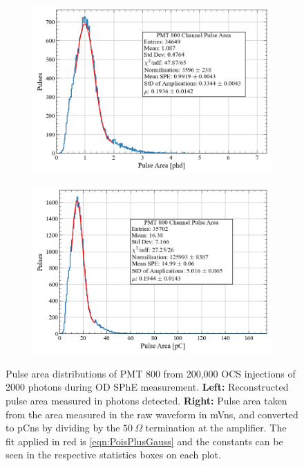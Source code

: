 \begin{figure}
     \centering
     \begin{subfigure}[b]{0.47\textwidth}
         \centering
         \includegraphics[width=\textwidth]{figures/ODCommissioning/PMT800_PulseArea_Distribution.png}
         \caption{}
         \label{fig:ODCommissioning/ODSPhE_phd}
     \end{subfigure}
     \begin{subfigure}[b]{0.47\textwidth}
         \centering
         \includegraphics[width=\textwidth]{figures/ODCommissioning/PMT800_PulseArea_Distribution_pC.png}
         \caption{}
         \label{fig:ODCommissioning/ODSPhE_pC}
     \end{subfigure}
        \caption{Pulse area distributions of PMT 800 from 200,000 OCS injections of 2000 photons during OD SPhE measurement. \textbf{Left:} Reconstructed pulse area measured in photons detected. \textbf{Right:} Pulse area taken from the area measured in the raw waveform in mVns, and converted to pCns by dividing by the $50~\Omega$ termination at the amplifier. The fit applied in red is \autoref{eqn:PoisPlusGauss} and the constants can be seen in the respective statistics boxes on each plot.}
        \label{fig:ODCommissioning/ODSPhEDists}
\end{figure}
